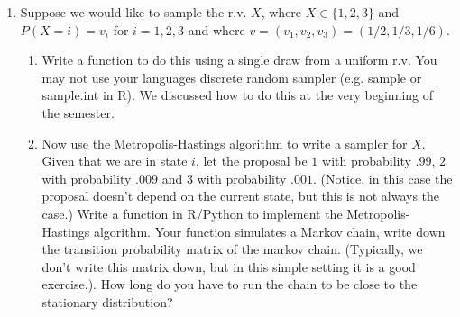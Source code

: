 \documentclass{article}
\begin{document}
\begin{enumerate}
\item Suppose we would like to sample the r.v. $X$, where $X \in \{1,2,3\}$ and $P(X = i) = v_i$ for $i=1,2,3$ and where $v = (v_1, v_2, v_3) = (1/2, 1/3, 1/6)$.  
\begin{enumerate}
\item Write a function to do this using a single draw from a uniform r.v.  You may not use your languages discrete random sampler (e.g. sample or sample.int in R).  We discussed how to do this at the very beginning of the semester.
\item Now use the Metropolis-Hastings algorithm to write a sampler for $X$.   Given that we are in state $i$, let the proposal be $1$ with probability $.99$, $2$ with probability $.009$ and $3$ with probability $.001$.  (Notice, in this case the proposal doesn't depend on the current state, but this is not always the case.)   Write a function in R/Python to implement the Metropolis-Hastings algorithm.   Your function simulates a Markov chain, write down the transition probability matrix of the markov chain.  (Typically, we don't write this matrix down, but in this simple setting it is a good exercise.).   How long do you have to run the chain to be close to the stationary distribution?   
\end{enumerate}


\end{enumerate}
\end{document}
